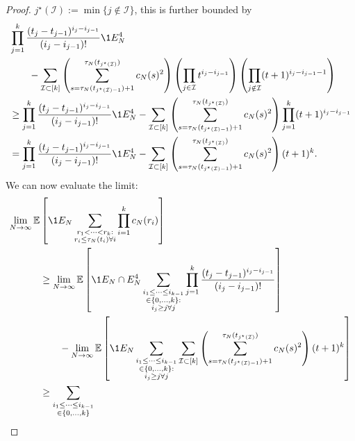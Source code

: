 \begin{proof}
$j^\star(\mathcal{I}) := \min\{j \notin \mathcal{I} \}$, this is further bounded by
\begin{align*}
& \prod_{j=1}^k \frac{(t_j - t_{j-1})^{i_j - i_{j-1}}}{(i_j - i_{j-1})!} 
        \1{E_N^4} \notag\\
    &\qquad- \sum_{\mathcal{I} \subset [k]} 
        \left( \sum_{s=\tau_N(t_{j^\star(\mathcal{I})-1})+1}
        ^{\tau_N(t_{j^\star(\mathcal{I})})} c_N(s)^2 \right)
        \left( \prod_{j\in\mathcal{I}} t^{i_j - i_{j-1}} \right)
        \left( \prod_{j\notin\mathcal{I}} ( t+1 )^{i_j - i_{j-1} -1} \right) \notag\\
&\geq \prod_{j=1}^k \frac{(t_j - t_{j-1})^{i_j - i_{j-1}}}{(i_j - i_{j-1})!} 
        \1{E_N^4}
        - \sum_{\mathcal{I} \subset [k]} 
        \left( \sum_{s=\tau_N(t_{j^\star(\mathcal{I})-1})+1}
        ^{\tau_N(t_{j^\star(\mathcal{I})})} c_N(s)^2 \right)
        \prod_{j=1}^k ( t+1 )^{i_j - i_{j-1}} \notag\\
&= \prod_{j=1}^k \frac{(t_j - t_{j-1})^{i_j - i_{j-1}}}{(i_j - i_{j-1})!} 
        \1{E_N^4}
        - \sum_{\mathcal{I} \subset [k]} 
        \left( \sum_{s=\tau_N(t_{j^\star(\mathcal{I})-1})+1}
        ^{\tau_N(t_{j^\star(\mathcal{I})})} c_N(s)^2 \right)
        ( t+1 )^k .
\end{align*}
We can now evaluate the limit:
\begin{align*}
\lim_{N\to\infty} \E &\left[ \1{E_N} \sum_{\substack{r_1<\dots<r_k :\\ 
        r_i\leq \tau_N(t_i) \forall i}} \prod_{i=1}^k c_N(r_i) \right] \\
&\geq \lim_{N\to\infty} \E \left[ \1{E_N \cap E_N^4} 
        \sum_{\substack{i_1\leq \dots\leq i_{k-1}\\ \in \{0,\dots,k\} 
        :\\ i_j \geq j \forall j}}
        \prod_{j=1}^k \frac{(t_j - t_{j-1})^{i_j - i_{j-1}}}{(i_j - i_{j-1})!} \right] 
        \notag\\
    &\qquad- \lim_{N\to\infty} \E \left[ \1{E_N} 
        \sum_{\substack{i_1\leq \dots\leq i_{k-1}\\ \in \{0,\dots,k\} 
        :\\ i_j \geq j \forall j}}
        \sum_{\mathcal{I} \subset [k]} 
        \left( \sum_{s=\tau_N(t_{j^\star(\mathcal{I}) -1})+1}
        ^{\tau_N(t_{j^\star(\mathcal{I}) })} c_N(s)^2 \right)
        ( t+1 )^k \right] \notag\\
&\geq \sum_{\substack{i_1\leq \dots\leq i_{k-1}\\ \in \{0,\dots,k\} 
}}
\end{align*}
\end{proof}
